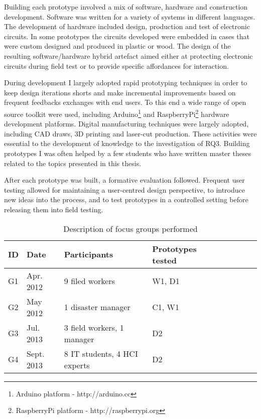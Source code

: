 Building each prototype involved a mix of software, hardware and
construction development. Software was written for a variety of systems
in different languages. The development of hardware included design,
production and test of electronic circuits. In some prototypes the
circuits developed were embedded in cases that were custom designed and
produced in plastic or wood. The design of the resulting
software/hardware hybrid artefact aimed either at protecting electronic
circuits during field test or to provide specific affordances for
interaction.

During development I largely adopted rapid prototyping techniques in
order to keep design iterations shorts and make incremental improvements
based on frequent feedbacks exchanges with end users. To this end a wide
range of open source toolkit were used, including Arduino\footnote{Arduino
  platform - http://arduino.cc} and RaspberryPi\footnote{RaspberryPi
  platform - http://raspberrypi.org} hardware development platforms.
Digital manufacturing techniques were largely adopted, including CAD
draws, 3D printing and laser-cut production. These activities were
essential to the development of knowledge to the investigation of RQ3.
Building prototypes I was often helped by a few students who have
written master theses related to the topics presented in this
thesis.

After each prototype was built, a formative evaluation followed.
Frequent user testing allowed for maintaining a user-centred design
perspective, to introduce new ideas into the process, and to test
prototypes in a controlled setting before releasing them into field
testing.

\begin{table}[h]
    \centering
    \caption{Description of focus groups performed}
    \label{labtests}
\begin{tabular}{@{}lllllllll@{}}    
\toprule
ID  & Date        & Participants      & Prototypes tested \\
\midrule
G1  & Apr. 2012  & 9 filed workers     & W1, D1 \\
G2  & May 2012   & 1 disaster manager  & C1, W1 \\
G3  & Jul. 2013  & 3 field workers, 1 manager & D2 \\
G4  & Sept. 2013 & 8 IT students, 4 HCI experts & D2 \\
\bottomrule
\end{tabular}
\end{table}

